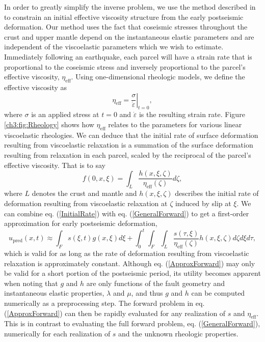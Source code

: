 In order to greatly simplify the inverse problem, we use the method described in \citet{Hines2016} to constrain an initial effective viscosity structure from the early postseismic deformation.  Our method uses the fact that coseismic stresses throughout the crust and upper mantle depend on the instantaneous elastic parameters and are independent of the viscoelastic parameters which we wish to estimate. Immediately following an earthquake, each parcel will have a strain rate that is proportional to the coseismic stress and inversely proportional to the parcel's effective viscosity, $\eta_\mathrm{eff}$.  Using one-dimensional rheologic models, we define the effective viscosity as
\begin{equation}
  \eta_\mathrm{eff} = \left.\frac{\sigma}{\dot{\varepsilon}}\right|_{t=0},
\end{equation}
where $\sigma$ is an applied stress at $t=0$ and $\dot\varepsilon$ is the resulting strain rate.  Figure \ref{ch3:fig:Rheology} shows how $\eta_\mathrm{eff}$ relates to the parameters for various linear viscoelastic rheologies.   We can deduce that the initial rate of surface deformation resulting from viscoelastic relaxation is a summation of the surface deformation resulting from relaxation in each parcel, scaled by the reciprocal of the parcel's effective viscosity.  That is to say   
\begin{equation}\label{InitialRate}
  f(0,x,\xi) = \int_L \frac{h(x,\xi,\zeta)}{\eta_\mathrm{eff}(\zeta)} d\zeta, 
\end{equation}
where $L$ denotes the crust and mantle and $h(x,\xi,\zeta)$ describes the initial rate of deformation resulting from viscoelastic relaxation at $\zeta$ induced by slip at $\xi$. We can combine eq. (\ref{InitialRate}) with eq. (\ref{GeneralForward}) to get a first-order approximation for early postseismic deformation,
\begin{equation}\label{ApproxForward}
  u_\mathrm{pred}(x,t) \approx \int_F s(\xi,t)g(x,\xi)d\xi + 
           \int_0^t\int_F\int_L \frac{s(\tau,\xi)}{\eta_\mathrm{eff}(\zeta)} h(x,\xi,\zeta) d\zeta d\xi d\tau,
\end{equation}
which is valid for as long as the rate of deformation resulting from viscoelastic relaxation is approximately constant.  Although eq. (\ref{ApproxForward}) may only be valid for a short portion of the postseismic period, its utility becomes apparent when noting that $g$ and $h$ are only functions of the fault geometry and instantaneous elastic properties, $\lambda$ and $\mu$, and thus $g$ and $h$ can be computed numerically as a preprocessing step.  The forward problem in eq. (\ref{ApproxForward}) can then be rapidly evaluated for any realization of $s$ and $\eta_{\mathrm{eff}}$.  This is in contrast to evaluating the full forward problem, eq. (\ref{GeneralForward}), numerically for each realization of $s$ and the unknown rheologic properties. 

